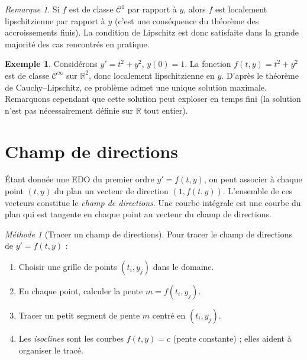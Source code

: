 \documentclass[12pt,a4paper,openany]{book}
\theoremstyle{definition}
\newtheorem{exemple}[definition]{Exemple}
\theoremstyle{plain}
\theoremstyle{remark}
\newtheorem{remarque}[definition]{Remarque}
\newtheorem{methode}[definition]{Méthode}
\newcommand{\R}{\mathbb{R}}
\begin{document}
\begin{remarque}
\label{rem:lipschitz-suffisante}
Si $f$ est de classe $\mathscr{C}^1$ par rapport à $y$, alors $f$ est localement lipschitzienne par rapport à $y$ (c'est une conséquence du théorème des accroissements finis). La condition de Lipschitz est donc satisfaite dans la grande majorité des cas rencontrés en pratique.
\end{remarque}

\begin{exemple}
\label{ex:cauchy-lipschitz-verification}
Considérons $y' = t^2 + y^2$, $y(0) = 1$. La fonction $f(t,y) = t^2 + y^2$ est de classe $\mathscr{C}^{\infty}$ sur $\R^2$, donc localement lipschitzienne en $y$. D'après le théorème de Cauchy--Lipschitz, ce problème admet une unique solution maximale. Remarquons cependant que cette solution peut exploser en temps fini (la solution n'est pas nécessairement définie sur $\R$ tout entier).
\end{exemple}

\section{Champ de directions}
\label{sec:champ-directions}

Étant donnée une EDO du premier ordre $y' = f(t,y)$, on peut associer à chaque point $(t,y)$ du plan un vecteur de direction $(1, f(t,y))$. L'ensemble de ces vecteurs constitue le \emph{champ de directions}. Une courbe intégrale est une courbe du plan qui est tangente en chaque point au vecteur du champ de directions.

\begin{methode}[Tracer un champ de directions]
\label{meth:champ-directions}
Pour tracer le champ de directions de $y' = f(t,y)$ :
\begin{enumerate}
\item Choisir une grille de points $(t_i, y_j)$ dans le domaine.
\item En chaque point, calculer la pente $m = f(t_i, y_j)$.
\item Tracer un petit segment de pente $m$ centré en $(t_i, y_j)$.
\item Les \emph{isoclines} sont les courbes $f(t,y) = c$ (pente constante) ; elles aident à organiser le tracé.
\end{enumerate}
\end{methode}
\end{document}
